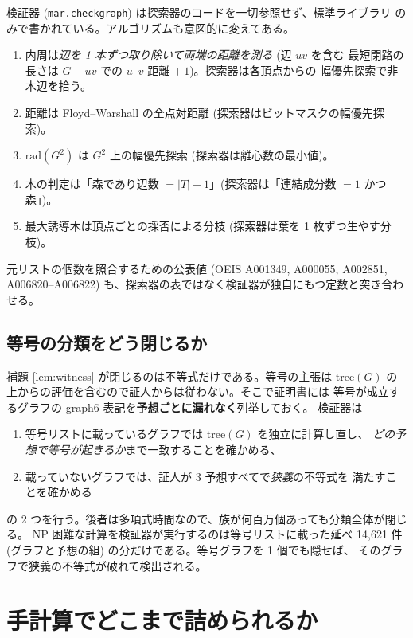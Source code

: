 \documentclass[paper=a4,fontsize=10.5pt,jafontsize=10.5pt]{jlreq}
\theoremstyle{plain}
\theoremstyle{definition}
\begin{document}
検証器 (\texttt{mar.checkgraph}) は探索器のコードを一切参照せず、標準ライブラリ
のみで書かれている。アルゴリズムも意図的に変えてある。

\begin{enumerate}
\item 内周は\emph{辺を 1 本ずつ取り除いて両端の距離を測る} (辺 $uv$ を含む
      最短閉路の長さは $G - uv$ での $u$--$v$ 距離 $+\,1$)。探索器は各頂点からの
      幅優先探索で非木辺を拾う。
\item 距離は Floyd--Warshall の全点対距離 (探索器はビットマスクの幅優先探索)。
\item $\mathrm{rad}(G^2)$ は $G^2$ 上の幅優先探索 (探索器は離心数の最小値)。
\item 木の判定は「森であり辺数 $= |T| - 1$」(探索器は「連結成分数 $= 1$ かつ森」)。
\item 最大誘導木は頂点ごとの採否による分枝 (探索器は葉を 1 枚ずつ生やす分枝)。
\end{enumerate}

元リストの個数を照合するための公表値 (OEIS A001349, A000055, A002851,
A006820--A006822) も、探索器の表ではなく検証器が独自にもつ定数と突き合わせる。

\subsection{等号の分類をどう閉じるか}\label{sec:eq}

補題 \ref{lem:witness} が閉じるのは不等式だけである。等号の主張は
$\mathrm{tree}(G)$ の上からの評価を含むので証人からは従わない。そこで証明書には
等号が成立するグラフの graph6 表記を\textbf{予想ごとに漏れなく}列挙しておく。
検証器は

\begin{enumerate}
\item 等号リストに載っているグラフでは $\mathrm{tree}(G)$ を独立に計算し直し、
      \emph{どの予想で等号が起きるか}まで一致することを確かめる、
\item 載っていないグラフでは、証人が 3 予想すべてで\emph{狭義}の不等式を
      満たすことを確かめる
\end{enumerate}

の 2 つを行う。後者は多項式時間なので、族が何百万個あっても分類全体が閉じる。
NP 困難な計算を検証器が実行するのは等号リストに載った延べ
14,621 件 (グラフと予想の組) の分だけである。等号グラフを 1 個でも隠せば、
そのグラフで狭義の不等式が破れて検出される。

\section{手計算でどこまで詰められるか}\label{sec:hand}
\end{document}
